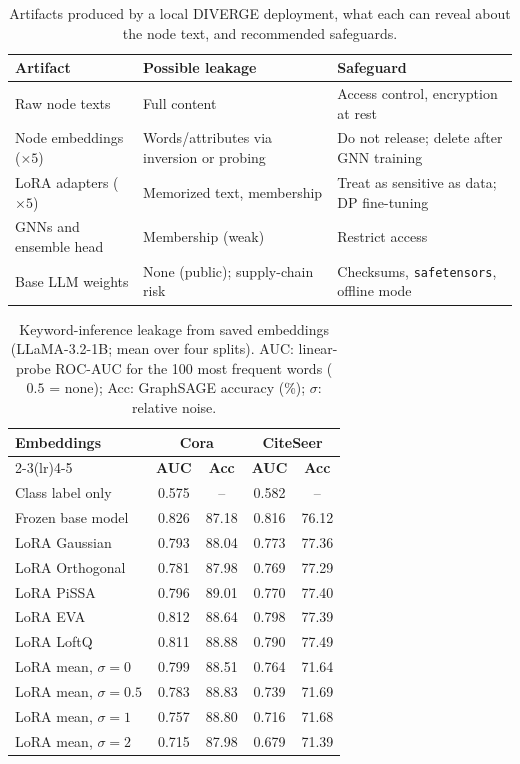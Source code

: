 \documentclass[a4paper,fleqn]{cas-sc}
\begin{document}
\begin{table}[htbp]
\centering\color{red}
\caption{Artifacts produced by a local DIVERGE deployment, what each can reveal about the node text, and recommended safeguards.}
\label{tab:privacy_artifacts}
\small
\begin{tabular*}{\columnwidth}{@{\extracolsep{\fill}} p{} p{} p{} @{}}
\toprule
\textbf{Artifact} & \textbf{Possible leakage} & \textbf{Safeguard} \\
\midrule
Raw node texts & Full content & Access control, encryption at rest \\
Node embeddings ($\times5$) & Words/attributes via inversion or probing & Do not release; delete after GNN training \\
LoRA adapters ($\times5$) & Memorized text, membership & Treat as sensitive as data; DP fine-tuning \\
GNNs and ensemble head & Membership (weak) & Restrict access \\
Base LLM weights & None (public); supply-chain risk & Checksums, \texttt{safetensors}, offline mode \\
\bottomrule
\end{tabular*}
\end{table}

\begin{table}[htbp]
\centering\color{red}
\caption{Keyword-inference leakage from saved embeddings (LLaMA-3.2-1B; mean over four splits). AUC: linear-probe ROC-AUC for the 100 most frequent words ($0.5$ = none); Acc: GraphSAGE accuracy (\%); $\sigma$: relative noise.}
\label{tab:privacy_probe}
\small
\begin{tabular*}{\columnwidth}{@{\extracolsep{\fill}} lcccc @{}}
\toprule
\multirow{2}{*}{\textbf{Embeddings}} & \multicolumn{2}{c}{\textbf{Cora}} & \multicolumn{2}{c}{\textbf{CiteSeer}} \\
\cmidrule(lr){2-3}\cmidrule(lr){4-5}
 & \textbf{AUC} & \textbf{Acc} & \textbf{AUC} & \textbf{Acc} \\
\midrule
Class label only    & 0.575 & --    & 0.582 & --    \\
Frozen base model   & 0.826 & 87.18 & 0.816 & 76.12 \\
\midrule
LoRA Gaussian       & 0.793 & 88.04 & 0.773 & 77.36 \\
LoRA Orthogonal     & 0.781 & 87.98 & 0.769 & 77.29 \\
LoRA PiSSA          & 0.796 & 89.01 & 0.770 & 77.40 \\
LoRA EVA            & 0.812 & 88.64 & 0.798 & 77.39 \\
LoRA LoftQ          & 0.811 & 88.88 & 0.790 & 77.49 \\
\midrule
LoRA mean, $\sigma=0$   & 0.799 & 88.51 & 0.764 & 71.64 \\
LoRA mean, $\sigma=0.5$ & 0.783 & 88.83 & 0.739 & 71.69 \\
LoRA mean, $\sigma=1$   & 0.757 & 88.80 & 0.716 & 71.68 \\
LoRA mean, $\sigma=2$   & 0.715 & 87.98 & 0.679 & 71.39 \\
\bottomrule
\end{tabular*}
\end{table}
\end{document}
